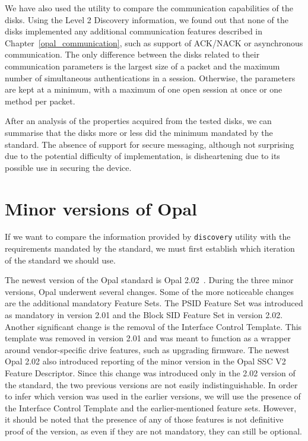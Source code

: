 We have also used the utility to compare the communication capabilities of the disks.
Using the Level 2 Discovery information, we found out that none of the disks implemented any additional communication features described in Chapter~\ref{opal_communication}, such as support of ACK/NACK or asynchronous communication. The only difference between the disks related to their communication parameters is the largest size of a packet and the maximum number of simultaneous authentications in a session.
Otherwise, the parameters are kept at a minimum, with a maximum of one open session at once or one method per packet.

After an analysis of the properties acquired from the tested disks, we can summarise that the disks more or less did the minimum mandated by the standard. 
The absence of support for secure messaging, although not surprising due to the potential difficulty of implementation, is disheartening due to its possible use in securing the device.



\section{Minor versions of Opal}

If we want to compare the information provided by \verb|discovery| utility with the requirements mandated by the standard, we must first establish which iteration of the standard we should use.

The newest version of the Opal standard is Opal 2.02~\cite{tcg-opal2}. During the three minor versions, Opal underwent several changes. 
Some of the more noticeable changes are the additional mandatory Feature Sets. The PSID Feature Set was introduced as mandatory in version 2.01 and the Block SID Feature Set in version 2.02. Another significant change is the removal of the Interface Control Template. This template was removed in version 2.01 and was meant to function as a wrapper around vendor-specific drive features, such as upgrading firmware.
The newest Opal 2.02 also introduced reporting of the minor version in the Opal SSC V2 Feature Descriptor. Since this change was introduced only in the 2.02 version of the standard, the two previous versions are not easily indistinguishable. In order to infer which version was used in the earlier versions, we will use the presence of the Interface Control Template and the earlier-mentioned feature sets. However, it should be noted that the presence of any of those features is not definitive proof of the version, as even if they are not mandatory, they can still be optional.


